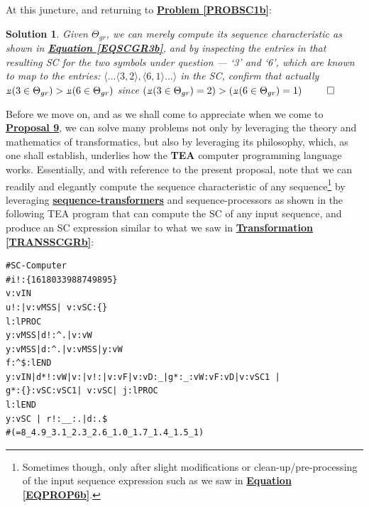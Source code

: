 \documentclass[a4paper, 18pt]{book} %
\newtheorem{soln}{Solution}
\newcommand{\invpi}{\rotatebox[origin=c]{180}{$\pi$}}
\begin{document}
At this juncture, and returning to \textbf{\hyperref[PROBSC1b]{Problem \ref{PROBSC1b}}}:

\vspace{1em}
\begin{soln}
Given $\Theta_{gr}$, we can merely compute its sequence characteristic as shown in \textbf{\hyperref[EQSCGR3b]{Equation \ref{EQSCGR3b}}}, and by inspecting the entries in that resulting SC for the two symbols under question --- `3' and `6', which are known to map to the entries: $\langle ... \langle 3, 2 \rangle, \langle 6, 1 \rangle ... \rangle$ in the SC, confirm that actually $\invpi(3 \in \Theta_{gr}) > \invpi(6 \in \Theta_{gr})$ since $(\invpi(3 \in \Theta_{gr})=2) > (\invpi(6 \in \Theta_{gr})=1)$
$\qed$
\end{soln}
\vspace{1em}

Before we move on, and as we shall come to appreciate when we come to \textbf{\hyperref[PROP9]{Proposal 9}}, we can solve many problems not only by leveraging the theory and mathematics of transformatics, but also by leveraging its philosophy, which, as one shall establish, underlies how the \textbf{TEA} computer programming language\cite{cli_tttt} works. Essentially, and with reference to the present proposal, note that we can readily and elegantly compute the sequence characteristic of any sequence\footnote{Sometimes though, only after slight modifications or clean-up/pre-processing of the input sequence expression such as we saw in \textbf{\hyperref[EQPROP6b]{Equation \ref{EQPROP6b}}}.} by leveraging \textbf{\hyperref[RES7]{sequence-transformers}} and sequence-processors as shown in the following TEA program that can compute the SC of any input sequence, and produce an SC expression similar to what we saw in \textbf{\hyperref[TRANSSCGRb]{Transformation \ref{TRANSSCGRb}}}:


  \begin{tcolorbox}[teaterminalstyle, title=TEA Program: SC-Transformer, breakable]
  \begin{lstlisting}[language=TEA,breaklines=true]
#SC-Computer
#i!:{1618033988749895} 
v:vIN
u!:|v:vMSS| v:vSC:{}
l:lPROC
y:vMSS|d!:^.|v:vW
y:vMSS|d:^.|v:vMSS|y:vW
f:^$:lEND
y:vIN|d*!:vW|v:|v!:|v:vF|v:vD:_|g*:_:vW:vF:vD|v:vSC1 |
g*:{}:vSC:vSC1| v:vSC| j:lPROC
l:lEND
y:vSC | r!:__:.|d:.$
#(=8_4.9_3.1_2.3_2.6_1.0_1.7_1.4_1.5_1)
   \end{lstlisting}
  \end{tcolorbox}
  \label{LISTSC}
  
\end{document}
